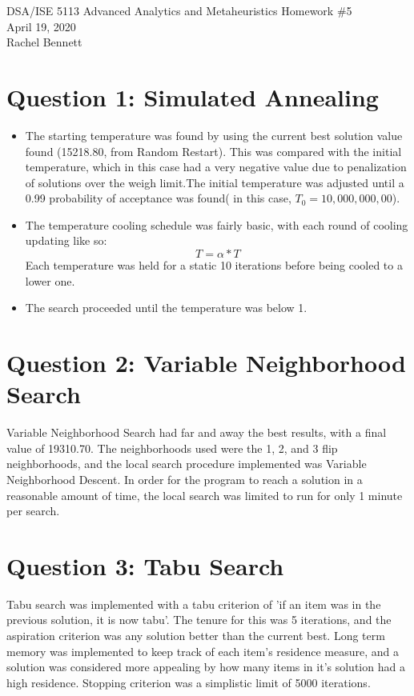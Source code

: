 \documentclass[12pt, letterpaper]{article}
\begin{document}
\begin{center}
\Large DSA/ISE 5113 Advanced Analytics and Metaheuristics
\Large Homework \#5\\
\vspace{3mm}
\normalsize April 19, 2020\\
\vspace{3mm}
\normalsize Rachel Bennett
\end{center}


\section*{Question 1: Simulated Annealing}
\begin{itemize}
\item The starting temperature was found by using the current best solution value found (15218.80, from Random Restart). This was compared with the initial temperature, which in this case had a very negative value due to penalization of solutions over the weigh limit.The initial temperature was adjusted until a 0.99 probability of acceptance was found( in this case, $T_0 =10,000,000,00$).
\item The temperature cooling schedule was fairly basic, with each round of cooling updating like so:
$$ T = \alpha * T$$
Each temperature was held for a static 10 iterations before being cooled to a lower one.
\item The search proceeded until the temperature was below 1. 
\end{itemize}

\section*{Question 2: Variable Neighborhood Search}
Variable Neighborhood Search had far and away the best results, with a final value of 19310.70. The neighborhoods used were the 1, 2, and 3 flip neighborhoods, and the local search procedure implemented was Variable Neighborhood Descent. In order for the program to reach a solution in a reasonable amount of time, the local search was limited to run for only 1 minute per search. 

\section*{Question 3: Tabu Search}

Tabu search was implemented with a tabu criterion of 'if an item was in the previous solution, it is now tabu'. The tenure for this was 5 iterations, and the aspiration criterion was any solution better than the current best. Long term memory was implemented to keep track of each item's residence measure, and a solution was considered more appealing by how many items in it's solution had a high residence. Stopping criterion was a simplistic limit of 5000 iterations.
\end{document}
